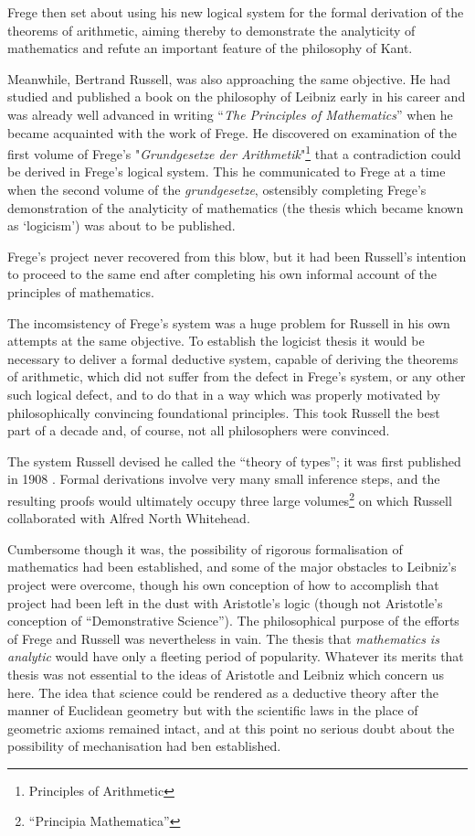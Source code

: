 Frege then set about using his new logical system for the formal derivation of the theorems of arithmetic, aiming thereby to demonstrate the analyticity of mathematics and refute an important feature of the philosophy of Kant.

Meanwhile, Bertrand Russell, was also approaching the same objective.
He had studied and published a book \cite{russellPL} on the philosophy of Leibniz early in his career and was already well advanced in writing ``\emph{The Principles of Mathematics}'' \cite{russellPRM} when he became acquainted with the work of Frege.
He discovered on examination of the first volume of Frege's "\emph{Grundgesetze der Arithmetik}"\footnote{Principles of Arithmetic} \cite{frege1893} that a contradiction could be derived in Frege's logical system.
This he communicated to Frege at a time when the second volume of the \emph{grundgesetze}, ostensibly completing
Frege's demonstration of the analyticity of mathematics (the thesis which became known as `logicism') was about to be published.

Frege's project never recovered from this blow, but it had been Russell's intention to proceed to the same end after completing his own informal account of the principles of mathematics. \cite{russellPRM}

The incomsistency of Frege's system was a huge problem for Russell in his own attempts at the same objective.
To establish the logicist thesis it would be necessary to deliver a formal deductive system, capable of deriving the theorems of arithmetic, which did not suffer from the defect in Frege's system, or any other such logical defect, and to do that in a way which was properly motivated by philosophically convincing foundational principles.
This took Russell the best part of a decade and, of course, not all philosophers were convinced.

The system Russell devised he called the ``theory of types''; it was first published in 1908 \cite{russell08}.
Formal derivations involve very many small inference steps, and the resulting proofs would ultimately occupy three large volumes\footnote{``Principia Mathematica''\cite{russell1913}} on which Russell collaborated with Alfred North Whitehead.

Cumbersome though it was, the possibility of rigorous formalisation of mathematics had been established, and some of the major obstacles to Leibniz's project were overcome, though his own conception of how to accomplish that project had been left in the dust with Aristotle's logic (though not Aristotle's conception of ``Demonstrative Science'').
The philosophical purpose of the efforts of Frege and Russell was nevertheless in vain.
The thesis that \emph{mathematics is analytic} would have only a fleeting period of popularity.
Whatever its merits that thesis was not essential to the ideas of Aristotle and Leibniz which concern us here.
The idea that science could be rendered as a deductive theory after the manner of Euclidean geometry but with the scientific laws in the place of geometric axioms remained intact, and at this point no serious doubt about the possibility of mechanisation had ben established.

